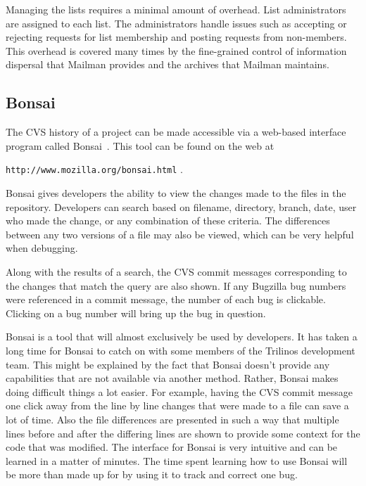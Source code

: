 \documentclass[12pt,relax]{article}
\newcommand{\InlineDirectory}[1]{
  {\hspace{0.01 in}} {\tt #1} {\hspace{0.01 in}}}
\begin{document}
Managing the lists requires a minimal amount of overhead.  List administrators
are assigned to each list.  The administrators handle issues such as accepting
or rejecting requests for list membership and posting requests from 
non-members.  This overhead is covered many times by the fine-grained control
of information dispersal that Mailman provides and the archives that 
Mailman maintains.

\subsection{Bonsai}
\label{subsect:Bonsai}

The CVS history of a project can be made accessible via a
web-based interface program called Bonsai~\cite{Bonsai}.  This tool can be 
found on the web at 
\newline
\InlineDirectory{http://www.mozilla.org/bonsai.html}.  

\begin{minipage}[c]{\textwidth}

\begin{minipage}[l]{.6\textwidth}

Bonsai gives developers the ability to view the changes made to the files in 
the repository. Developers can search 
based on filename, directory, branch, date, user who made the 
change, or any combination of these criteria.  The differences between any two 
versions of a file may also be viewed, which can be very helpful when 
debugging.  
\end{minipage}\hfill
{}
\end{minipage}

Along with the results of a search, the CVS commit messages corresponding to 
the changes that match the query are also shown.  If any Bugzilla bug numbers 
were referenced in a commit message, the number of each bug is clickable.  
Clicking on a bug number will bring up the bug in question.  

Bonsai is a tool that will almost exclusively be used by developers.  It has 
taken a long time for Bonsai to catch on with some members of the Trilinos 
development team.  This might be explained by the fact that Bonsai doesn't 
provide any capabilities that are not available via another method.  
Rather, Bonsai makes doing difficult things a lot easier.
For example, having the CVS commit message one click away from the line 
by line changes that
were made to a file can save a lot of time.  Also the file differences are 
presented in such a way that multiple lines before and after the differing 
lines are shown to provide some context for the code that was modified.  
The interface for Bonsai is very intuitive and can be learned in a matter of 
minutes.  The time spent learning how to use Bonsai will be more than made up 
for by using it to track and correct one bug.
\end{document}
